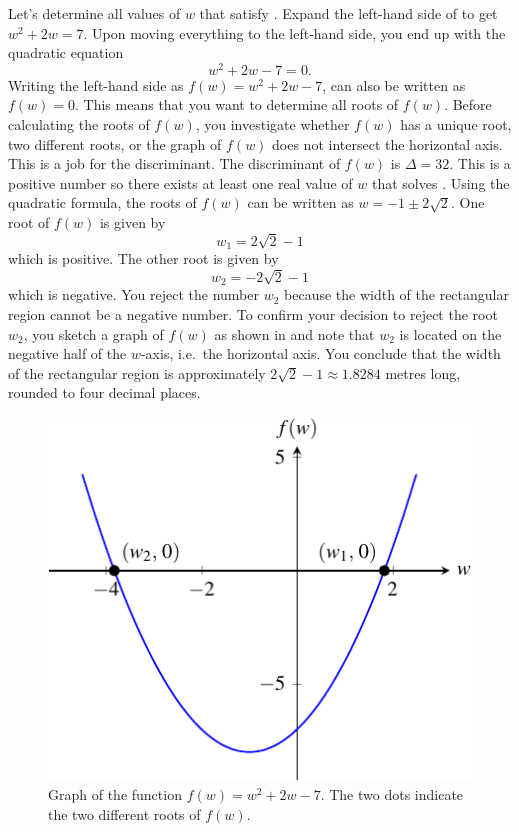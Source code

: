 \documentclass[a4paper,oneside,12pt]{article}
\begin{document}
\begin{solution}
Let's determine all values of $w$ that satisfy
.  Expand the left-hand side
of  to get $w^2 + 2w = 7$.
Upon moving everything to the left-hand side, you end up with the
quadratic equation
\begin{equation}
\label{eqn:rectangular_region_quadratic}
w^2 + 2w - 7
=
0.
\end{equation}
Writing the left-hand side as $f(w) = w^2 + 2w - 7$,
 can also be written as
$f(w) = 0$.  This means that you want to determine all roots of
$f(w)$.  Before calculating the roots of $f(w)$, you investigate
whether $f(w)$ has a unique root, two different roots, or the graph of
$f(w)$ does not intersect the horizontal axis.  This is a job for the
discriminant.  The discriminant of $f(w)$ is $\Delta = 32$.  This is a
positive number so there exists at least one real value of $w$ that
solves .  Using the
quadratic formula, the roots of $f(w)$ can be written as
$w = -1 \pm 2\sqrt{2}$.  One root of $f(w)$ is given by
\[
w_1
=
2\sqrt{2} - 1
\]
which is positive.  The other root is given by
\[
w_2
=
-2\sqrt{2} - 1
\]
which is negative.  You reject the number $w_2$ because the width of
the rectangular region cannot be a negative number.  To confirm your
decision to reject the root $w_2$, you sketch a graph of $f(w)$ as
shown in  and note that
$w_2$ is located on the negative half of the $w$-axis, i.e.~the
horizontal axis.  You conclude that the width of the rectangular
region is approximately $2\sqrt{2} - 1 \approx 1.8284$ metres long,
rounded to four decimal places.
\end{solution}

\begin{figure}[!htbp]
\centering
\includegraphics[scale=1]{image/09/a1-b2-cminus7.pdf}
\caption{%
  Graph of the function $f(w) = w^2 + 2w - 7$.  The two dots indicate
  the two different roots of $f(w)$.
}
\label{fig:rectangular_region_quadratic_roots}
\end{figure}
\end{document}
